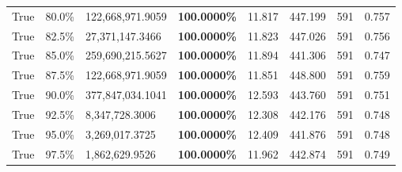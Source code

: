 \begin{table}[H]
\begin{tabular}{lllrllll}
\cline{1-8}
True & 80.0\% & 122,668,971.9059 & \bfseries \color{red} 100.0000\% & 11.817 & 447.199 & 591 & 0.757 \\
\cline{1-8}
True & 82.5\% & 27,371,147.3466 & \bfseries \color{red} 100.0000\% & 11.823 & 447.026 & 591 & 0.756 \\
\cline{1-8}
True & 85.0\% & 259,690,215.5627 & \bfseries \color{red} 100.0000\% & 11.894 & 441.306 & 591 & 0.747 \\
\cline{1-8}
True & 87.5\% & 122,668,971.9059 & \bfseries \color{red} 100.0000\% & 11.851 & 448.800 & 591 & 0.759 \\
\cline{1-8}
True & 90.0\% & 377,847,034.1041 & \bfseries \color{red} 100.0000\% & 12.593 & 443.760 & 591 & 0.751 \\
\cline{1-8}
True & 92.5\% & 8,347,728.3006 & \bfseries \color{red} 100.0000\% & 12.308 & 442.176 & 591 & 0.748 \\
\cline{1-8}
True & 95.0\% & 3,269,017.3725 & \bfseries \color{red} 100.0000\% & 12.409 & 441.876 & 591 & 0.748 \\
\cline{1-8}
True & 97.5\% & 1,862,629.9526 & \bfseries \color{red} 100.0000\% & 11.962 & 442.874 & 591 & 0.749 \\
\cline{1-8}
\bottomrule
\end{tabular}
\end{table}
